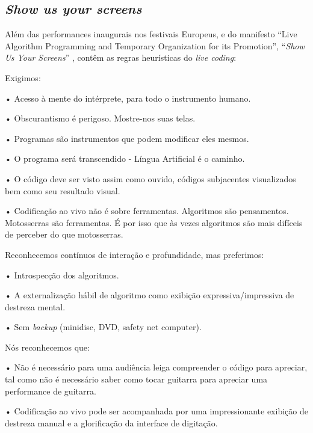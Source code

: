 \subsection{\emph{Show us your screens}}\label{sec:showusyourscreens}

Além das performances inaugurais nos festivais Europeus, e do manifesto ``Live Algorithm Programming and Temporary Organization for its Promotion'', ``\emph{Show Us Your Screens}''  \cite[p.~22; online]{griffiths_fluxus:_2008,mccallum_show_2011}, contêm as regras heurísticas do \emph{live coding}:

\begin{citacao}
Exigimos:

• Acesso à mente do intérprete, para todo o instrumento humano.

• Obscurantismo é perigoso. Mostre-nos suas telas.

• Programas são instrumentos que podem modificar eles mesmos.

• O programa será transcendido - Língua Artificial é o caminho.

• O código deve ser visto assim como ouvido, códigos subjacentes visualizados bem como seu resultado visual.

• Codificação ao vivo não é sobre ferramentas. Algoritmos são pensamentos. Motosserras são ferramentas. É por isso que às vezes algoritmos são mais difíceis de perceber do que motosserras.

Reconhecemos contínuos de interação e profundidade, mas preferimos:

• Introspecção dos algoritmos.

• A externalização hábil de algoritmo como exibição expressiva/impressiva de destreza mental.

• Sem \emph{backup} (minidisc, DVD, safety net computer).

Nós reconhecemos que:

• Não é necessário para uma audiência leiga compreender o código para apreciar, tal como não é necessário saber como tocar guitarra para apreciar uma performance de guitarra.

• Codificação ao vivo pode ser acompanhada por uma impressionante exibição de destreza manual e a glorificação da interface de digitação.


\end{citacao}
